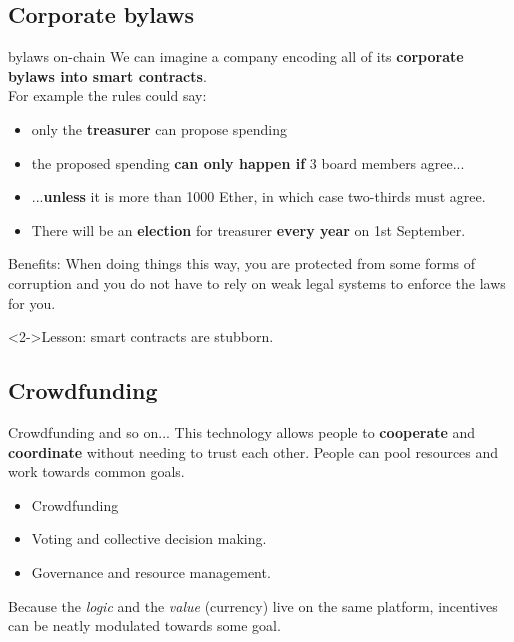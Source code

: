 \documentclass{beamer}
\begin{document}
\subsection[bylaws]{Corporate bylaws}
\begin{frame}{bylaws on-chain}
We can imagine a company encoding all of its \textbf{corporate bylaws into smart contracts}. \\
For example the rules could say:
\begin{itemize}
 \item<2-> only the \textbf<2>{treasurer} can propose spending
 \item<3-> the proposed spending \textbf<3>{can only happen if} 3 board members agree...
 \item<4-> ...\textbf<4>{unless} it is more than 1000 Ether, in which case two-thirds must agree.
 \item<5-> There will be an \textbf<5>{election} for treasurer \textbf<5>{every year} on 1st September.
\end{itemize}
\end{frame}
\begin{frame}{Benefits:}
When doing things this way, you are protected from some forms of corruption and you do not have to rely on weak legal systems to enforce the laws for you.
\begin{block}<2->{Lesson:}
 smart contracts are stubborn.
\end{block}

 
\end{frame}

\subsection[crowdfunding]{Crowdfunding}
\begin{frame}{Crowdfunding and so on...}
 This technology allows people to \textbf{cooperate} and \textbf{coordinate} without needing to trust each other. People can pool resources and work towards common goals.
 \begin{itemize}
  \item Crowdfunding
  \item Voting and collective decision making.
  \item Governance and resource management.
 \end{itemize}
Because the \textit{logic} and the \textit{value} (currency) live on the same platform, incentives can be neatly modulated towards some goal.
\end{frame}
\end{document}
